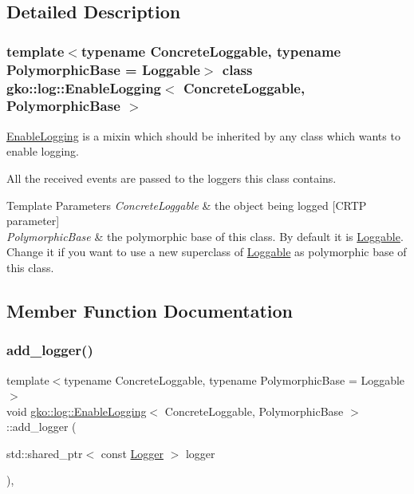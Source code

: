 \subsection{Detailed Description}
\subsubsection*{template$<$typename Concrete\+Loggable, typename Polymorphic\+Base = Loggable$>$\newline
class gko\+::log\+::\+Enable\+Logging$<$ Concrete\+Loggable, Polymorphic\+Base $>$}

\hyperlink{classgko_1_1log_1_1EnableLogging}{Enable\+Logging} is a mixin which should be inherited by any class which wants to enable logging. 

All the received events are passed to the loggers this class contains.


\begin{DoxyTemplParams}{Template Parameters}
{\em Concrete\+Loggable} & the object being logged \mbox{[}C\+R\+TP parameter\mbox{]}\\
\hline
{\em Polymorphic\+Base} & the polymorphic base of this class. By default it is \hyperlink{classgko_1_1log_1_1Loggable}{Loggable}. Change it if you want to use a new superclass of {\ttfamily \hyperlink{classgko_1_1log_1_1Loggable}{Loggable}} as polymorphic base of this class. \\
\hline
\end{DoxyTemplParams}


\subsection{Member Function Documentation}
\mbox{\label{classgko_1_1log_1_1EnableLogging_a7b3493c14a37b4d46487d9c636d784f2}} 
\subsubsection{\texorpdfstring{add\+\_\+logger()}{add\_logger()}}
{\footnotesize\ttfamily template$<$typename Concrete\+Loggable, typename Polymorphic\+Base = Loggable$>$ \\
void \hyperlink{classgko_1_1log_1_1EnableLogging}{gko\+::log\+::\+Enable\+Logging}$<$ Concrete\+Loggable, Polymorphic\+Base $>$\+::add\+\_\+logger (\begin{DoxyParamCaption}\item[{std\+::shared\+\_\+ptr$<$ const \hyperlink{classgko_1_1log_1_1Logger}{Logger} $>$}]{logger }\end{DoxyParamCaption})\hspace{0.3cm}{\ttfamily [override]}, {\ttfamily [virtual]}}



